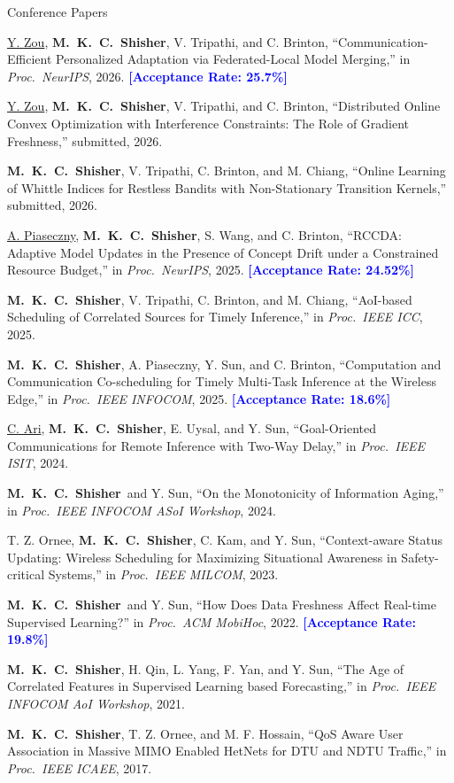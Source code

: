 \documentclass[10pt,letterpaper]{article}
\newcommand{\cvsubsection}[1]{\par
  \ifnum\lastpenalty=10000 \else\addvspace{8pt}\needspace{3\baselineskip}\fi
  \noindent #1\par\nobreak\addvspace{6pt}}
\newenvironment{publist}[2]{%
  \def\pubtotal{#2}%
  \begin{enumerate}[label={[#1\revpubnum]},
                    leftmargin=2.6em,labelwidth=2.3em,labelsep=0.3em,align=left,
                    itemsep=3pt,topsep=2pt,parsep=0pt]}%
  {\end{enumerate}}
\newcommand{\me}{\textbf{M.~K.~C.~Shisher}}      %
\newcommand{\mentee}[1]{\underline{#1}}          %
\newcommand{\note}[1]{\textcolor{blue}{\textbf{[#1]}}}  %
\begin{document}
\cvsubsection{Conference Papers}
\begin{publist}{C}{12}
  \item \mentee{Y. Zou}, \me, V. Tripathi, and C. Brinton,
        ``Communication-Efficient Personalized Adaptation via Federated-Local Model Merging,''
        in \emph{Proc.\ NeurIPS}, 2026. \note{Acceptance Rate: 25.7\%}
  \item \mentee{Y. Zou}, \me, V. Tripathi, and C. Brinton,
        ``Distributed Online Convex Optimization with Interference Constraints: The Role of
        Gradient Freshness,'' submitted, 2026.
  \item \me, V. Tripathi, C. Brinton, and M. Chiang,
        ``Online Learning of Whittle Indices for Restless Bandits with Non-Stationary
        Transition Kernels,'' submitted, 2026.
  \item \mentee{A. Piaseczny}, \me, S. Wang, and C. Brinton,
        ``RCCDA: Adaptive Model Updates in the Presence of Concept Drift under a Constrained
        Resource Budget,'' in \emph{Proc.\ NeurIPS}, 2025. \note{Acceptance Rate: 24.52\%}
  \item \me, V. Tripathi, C. Brinton, and M. Chiang,
        ``AoI-based Scheduling of Correlated Sources for Timely Inference,''
        in \emph{Proc.\ IEEE ICC}, 2025.
  \item \me, A. Piaseczny, Y. Sun, and C. Brinton,
        ``Computation and Communication Co-scheduling for Timely Multi-Task Inference at the
        Wireless Edge,'' in \emph{Proc.\ IEEE INFOCOM}, 2025. \note{Acceptance Rate: 18.6\%}
  \item \mentee{C. Ari}, \me, E. Uysal, and Y. Sun,
        ``Goal-Oriented Communications for Remote Inference with Two-Way Delay,''
        in \emph{Proc.\ IEEE ISIT}, 2024.
  \item \me\ and Y. Sun, ``On the Monotonicity of Information Aging,''
        in \emph{Proc.\ IEEE INFOCOM ASoI Workshop}, 2024.
  \item T. Z. Ornee, \me, C. Kam, and Y. Sun,
        ``Context-aware Status Updating: Wireless Scheduling for Maximizing Situational
        Awareness in Safety-critical Systems,'' in \emph{Proc.\ IEEE MILCOM}, 2023.
  \item \me\ and Y. Sun, ``How Does Data Freshness Affect Real-time Supervised Learning?''
        in \emph{Proc.\ ACM MobiHoc}, 2022. \note{Acceptance Rate: 19.8\%}
  \item \me, H. Qin, L. Yang, F. Yan, and Y. Sun,
        ``The Age of Correlated Features in Supervised Learning based Forecasting,''
        in \emph{Proc.\ IEEE INFOCOM AoI Workshop}, 2021.
  \item \me, T. Z. Ornee, and M. F. Hossain,
        ``QoS Aware User Association in Massive MIMO Enabled HetNets for DTU and NDTU
        Traffic,'' in \emph{Proc.\ IEEE ICAEE}, 2017.
\end{publist}
\end{document}
